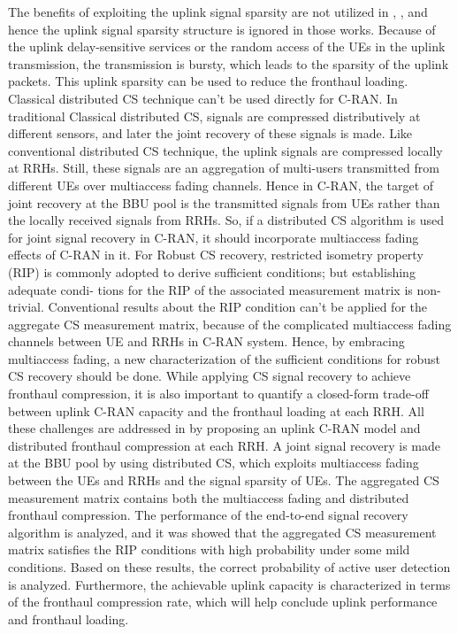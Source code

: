 \begin{multicols}{2}
\begin{itemize}
The benefits of exploiting the uplink signal sparsity are not utilized in \cite{art3-key52}, \cite{art3-key53}, and hence the uplink signal sparsity structure is ignored in those works. Because of the uplink delay-sensitive services or the random access of the UEs in the uplink transmission, the transmission is bursty, which leads to the sparsity of the uplink packets. This uplink sparsity can be used to reduce the fronthaul loading. Classical distributed CS technique can’t be used directly for C-RAN. In traditional Classical distributed CS, signals are compressed distributively at different sensors, and later the joint recovery of these signals is made. Like conventional distributed CS technique, the uplink signals are compressed locally at RRHs. Still, these signals are an aggregation of multi-users transmitted from different UEs over multiaccess fading channels. Hence in C-RAN, the target of joint recovery at the BBU pool is the transmitted signals from UEs rather than the locally received signals from RRHs. So, if a distributed CS algorithm is used for joint signal recovery in C-RAN, it should incorporate multiaccess fading effects of C-RAN in it. For Robust CS recovery, restricted isometry property (RIP) is commonly adopted to derive sufficient conditions; but establishing adequate condi- tions for the RIP of the associated measurement matrix is non- trivial. Conventional results about the RIP condition can’t be applied for the aggregate CS measurement matrix, because of the complicated multiaccess fading channels between UE and RRHs in C-RAN system. Hence, by embracing multiaccess fading, a new characterization of the sufficient conditions for robust CS recovery should be done. While applying CS signal recovery to achieve fronthaul compression, it is also important to quantify a closed-form trade-off between uplink C-RAN capacity and the fronthaul loading at each RRH. All these challenges are addressed in \cite{art3-key54} by proposing an uplink C-RAN model and distributed fronthaul compression at each RRH. A joint signal recovery is made at the BBU pool by using distributed CS, which exploits multiaccess fading between the UEs and RRHs and the signal sparsity of UEs. The aggregated CS measurement matrix contains both the multiaccess fading and distributed fronthaul compression. The performance of the end-to-end signal recovery algorithm is analyzed, and it was showed that the aggregated CS measurement matrix satisfies the RIP conditions with high probability under some mild conditions. Based on these results, the correct probability of active user detection is analyzed. Furthermore, the achievable uplink capacity is characterized in terms of the fronthaul compression rate, which will help conclude uplink performance and fronthaul loading. 


\end{itemize}
\end{multicols}
